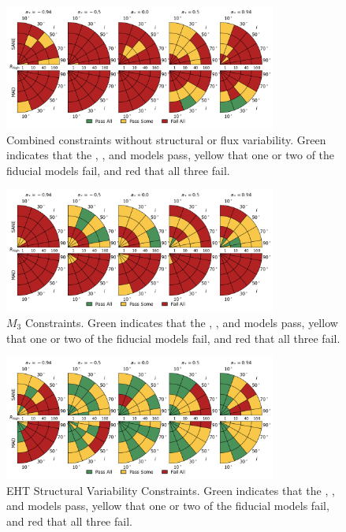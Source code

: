 
\begin{figure}
  \centering
  \includegraphics[width=0.8\textwidth]{./figures/All_Constraints.png}
  \caption{Combined constraints without structural or flux variability.  Green indicates that the \kharma, \bhac, and \hamr models pass, yellow that one or two of the fiducial models fail, and red that all three fail.}
  \label{fig:all_pizza_app}
\end{figure}


\begin{figure}
  \centering
  \includegraphics[width=0.8\textwidth]{./figures/230GHz_3Hr_MI_Constraints.png}
  \caption{$M_3$ Constraints.  Green indicates that the \kharma, \bhac, and \hamr models pass, yellow that one or two of the fiducial models fail, and red that all three fail.}
  \label{fig:m3_pizza}
\end{figure}

\begin{figure}
  \centering
  \includegraphics[width=0.8\textwidth]{./figures/4Glam_Constraints.png}
  \caption{EHT Structural Variability Constraints.  Green indicates that the \kharma, \bhac, and \hamr models pass, yellow that one or two of the fiducial models fail, and red that all three fail.}
  \label{fig:ehtvar_pizza}
\end{figure}

